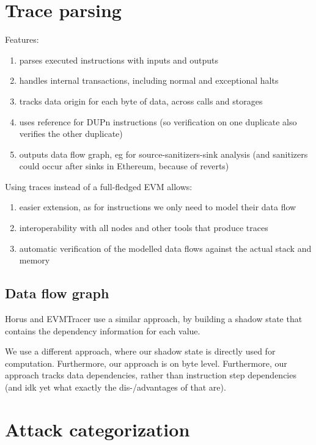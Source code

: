 \documentclass[draft,final]{vutinfth} %
\begin{document}
\section{Trace parsing}

Features:

\begin{enumerate}
    \item parses executed instructions with inputs and outputs
    \item handles internal transactions, including normal and exceptional halts
    \item tracks data origin for each byte of data, across calls and storages
    \item uses reference for DUPn instructions (so verification on one duplicate also verifies the other duplicate)
    \item outputs data flow graph, eg for source-sanitizers-sink analysis (and sanitizers could occur after sinks in Ethereum, because of reverts)
\end{enumerate}

Using traces instead of a full-fledged EVM allows:

\begin{enumerate}
    \item easier extension, as for instructions we only need to model their data flow
    \item interoperability with all nodes and other tools that produce traces
    \item automatic verification of the modelled data flows against the actual stack and memory
\end{enumerate}

\subsection{Data flow graph}

Horus and EVMTracer use a similar approach, by building a shadow state that contains the dependency information for each value.

We use a different approach, where our shadow state is directly used for computation. Furthermore, our approach is on byte level. Furthermore, our approach tracks data dependencies, rather than instruction step dependencies (and idk yet what exactly the dis-/advantages of that are).

\section{Attack categorization}
\end{document}
